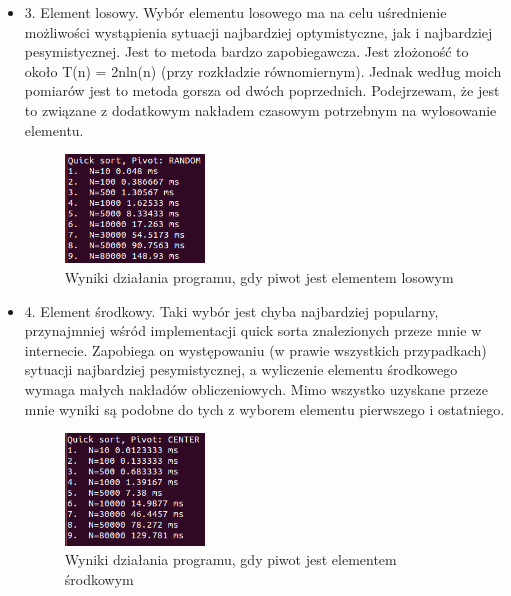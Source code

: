 \documentclass[11pt]{article}
\begin{document}
\begin{itemize}
\item 3. Element losowy. \newline
Wybór elementu losowego ma na celu uśrednienie możliwości wystąpienia sytuacji najbardziej optymistyczne, jak i najbardziej pesymistycznej. Jest to metoda bardzo zapobiegawcza. Jest złożoność to około T(n) = 2nln(n) (przy rozkładzie równomiernym). Jednak według moich pomiarów jest to metoda gorsza od dwóch poprzednich. Podejrzewam, że jest to związane z dodatkowym nakładem czasowym potrzebnym na wylosowanie elementu.
\begin{figure}[ht]
\centering
\includegraphics[width=0.35\textwidth]{random.png}
\caption{Wyniki działania programu, gdy piwot jest elementem losowym}
\label{fig1}
\end{figure}

\item 4. Element środkowy. \newline
Taki wybór jest chyba najbardziej popularny, przynajmniej wśród implementacji quick sorta znalezionych przeze mnie w internecie. Zapobiega on występowaniu (w prawie wszystkich przypadkach) sytuacji najbardziej pesymistycznej, a wyliczenie elementu środkowego wymaga małych nakładów obliczeniowych. Mimo wszystko uzyskane przeze mnie wyniki są podobne do tych z wyborem elementu pierwszego i ostatniego.
\begin{figure}[ht]
\centering
\includegraphics[width=0.35\textwidth]{center.png}
\caption{Wyniki działania programu, gdy piwot jest elementem środkowym}
\label{fig1}
\end{figure}


\end{itemize}
\end{document}
